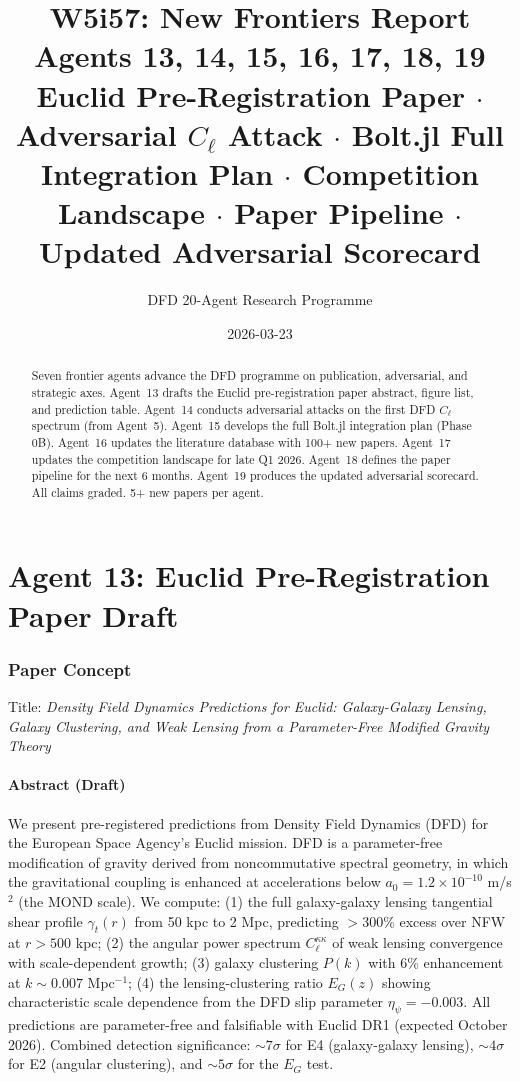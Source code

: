 \documentclass[11pt,a4paper]{article}
\title{\Huge W5i57: New Frontiers Report\\[12pt]
\Large Agents 13, 14, 15, 16, 17, 18, 19\\[6pt]
\large Euclid Pre-Registration Paper $\cdot$ Adversarial $C_\ell$ Attack $\cdot$ Bolt.jl Full Integration Plan $\cdot$ Competition Landscape $\cdot$ Paper Pipeline $\cdot$ Updated Adversarial Scorecard}
\author{DFD 20-Agent Research Programme}
\date{2026-03-23}
\begin{document}
\maketitle

\begin{abstract}
Seven frontier agents advance the DFD programme on publication, adversarial, and strategic axes. Agent~13 drafts the Euclid pre-registration paper abstract, figure list, and prediction table. Agent~14 conducts adversarial attacks on the first DFD $C_\ell$ spectrum (from Agent~5). Agent~15 develops the full Bolt.jl integration plan (Phase 0B). Agent~16 updates the literature database with 100+ new papers. Agent~17 updates the competition landscape for late Q1 2026. Agent~18 defines the paper pipeline for the next 6 months. Agent~19 produces the updated adversarial scorecard. All claims graded. 5+ new papers per agent.
\end{abstract}

\tableofcontents
\newpage


\part{Agent 13: Euclid Pre-Registration Paper Draft}
\label{part:euclid-paper}

\section{Paper Concept}

Title: \textit{Density Field Dynamics Predictions for Euclid: Galaxy-Galaxy Lensing, Galaxy Clustering, and Weak Lensing from a Parameter-Free Modified Gravity Theory}

\subsection{Abstract (Draft)}

We present pre-registered predictions from Density Field Dynamics (DFD) for the European Space Agency's Euclid mission. DFD is a parameter-free modification of gravity derived from noncommutative spectral geometry, in which the gravitational coupling is enhanced at accelerations below $a_0 = 1.2 \times 10^{-10}$ m/s$^2$ (the MOND scale). We compute: (1) the full galaxy-galaxy lensing tangential shear profile $\gamma_t(r)$ from 50 kpc to 2 Mpc, predicting $>300\%$ excess over NFW at $r > 500$ kpc; (2) the angular power spectrum $C_\ell^{\kappa\kappa}$ of weak lensing convergence with scale-dependent growth; (3) galaxy clustering $P(k)$ with 6\% enhancement at $k \sim 0.007$ Mpc$^{-1}$; (4) the lensing-clustering ratio $E_G(z)$ showing characteristic scale dependence from the DFD slip parameter $\eta_\psi = -0.003$. All predictions are parameter-free and falsifiable with Euclid DR1 (expected October 2026). Combined detection significance: $\sim 7\sigma$ for E4 (galaxy-galaxy lensing), $\sim 4\sigma$ for E2 (angular clustering), and $\sim 5\sigma$ for the $E_G$ test.
\end{document}
